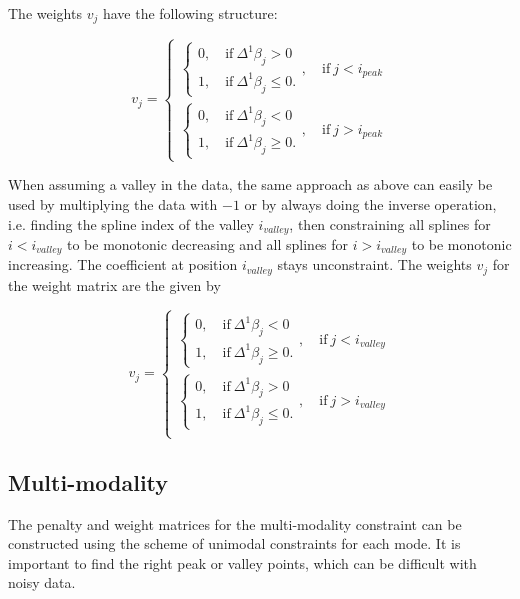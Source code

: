 \documentclass[10pt,a4paper]{article}
\begin{document}
	The weights $v_j$ have the following structure:
	
	$$v_j = \begin{cases} \begin{cases} 0, \quad \text{if} \ \Delta^1\beta_j > 0 \\ 
	1, \quad \text{if} \ \Delta^1\beta_j \le 0.\end{cases}, \quad \text{if} \ j < i_{peak} \\ \begin{cases} 0, \quad \text{if} \ \Delta^1\beta_j < 0 \\ 
	1, \quad \text{if} \ \Delta^1\beta_j \ge 0.\end{cases}  , \quad \text{if} \ j > i_ {peak}  \end{cases}$$
	
	When assuming a valley in the data, the same approach as above can easily be used by multiplying the data with $-1$ or by always doing the inverse operation, i.e. finding the spline index of the valley $i_{valley}$, then constraining all splines for $i < i_{valley}$ to be monotonic decreasing and all splines for $i > i_{valley}$ to be monotonic increasing. The coefficient at position $i_{valley}$ stays unconstraint. The weights $v_j$ for the weight matrix are the given by
	
	$$v_j = \begin{cases}\begin{cases} 0, \quad \text{if} \ \Delta^1\beta_j < 0 \\ 
	1, \quad \text{if} \ \Delta^1\beta_j \ge 0.\end{cases}  , \quad \text{if} \ j < i_{valley}  \\ \begin{cases} 0, \quad \text{if} \ \Delta^1\beta_j > 0 \\ 
	1, \quad \text{if} \ \Delta^1\beta_j \le 0.\end{cases}, \quad \text{if} \ j > i_{valley} \\ \end{cases}$$
	
	\subsection{Multi-modality} 
	
	The penalty and weight matrices for the multi-modality constraint can be constructed using the scheme of unimodal constraints for each mode. It is important to find the right peak or valley points, which can be difficult with noisy data. 
	
\end{document}
